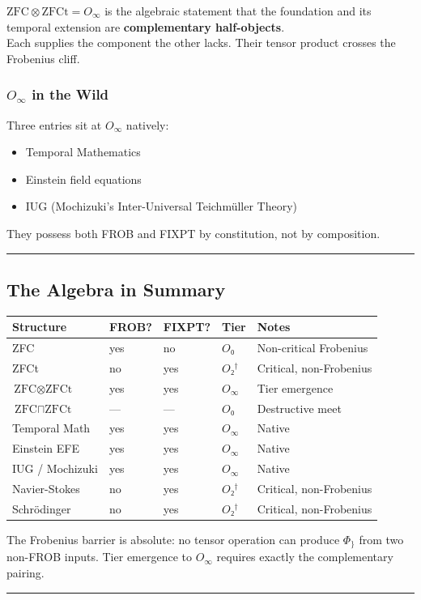 \documentclass[12pt,a4paper]{article}
\begin{document}
$\text{ZFC} \otimes \text{ZFCt} = O_\infty$ is the algebraic statement that the foundation and its temporal extension are \textbf{complementary half-objects}. \\
Each supplies the component the other lacks. Their tensor product crosses the Frobenius cliff.

\subsubsection*{$O_\infty$ in the Wild}

Three entries sit at $O_\infty$ natively:

\begin{itemize}
    \item Temporal Mathematics
    \item Einstein field equations
    \item IUG (Mochizuki's Inter-Universal Teichmüller Theory)
\end{itemize}

They possess both FROB and FIXPT by constitution, not by composition.

\begin{center}
\rule{0.5\textwidth}{0.4pt}
\end{center}

\subsection*{The Algebra in Summary}

\begin{table}[htbp]
\centering
\small

\begin{tabularx}{\textwidth}{>{\raggedright\arraybackslash}X >{\centering\arraybackslash}X >{\centering\arraybackslash}X >{\centering\arraybackslash}X >{\raggedright\arraybackslash}X}
\toprule
\textbf{Structure} & \textbf{FROB?} & \textbf{FIXPT?} & \textbf{Tier} & \textbf{Notes} \\
\midrule

ZFC & yes & no & $O₀$ & Non-critical Frobenius \\
ZFCt & no & yes & $O₂^\dagger$ & Critical, non-Frobenius \\
$\text{ZFC} \otimes \text{ZFCt}$ & yes & yes & $O_\infty$ & Tier emergence \\
$\text{ZFC} \sqcap \text{ZFCt}$ & --- & --- & $O₀$ & Destructive meet \\
Temporal Math & yes & yes & $O_\infty$ & Native \\
Einstein EFE & yes & yes & $O_\infty$ & Native \\
IUG / Mochizuki & yes & yes & $O_\infty$ & Native \\
Navier-Stokes & no & yes & $O₂^\dagger$ & Critical, non-Frobenius \\
Schrödinger & no & yes & $O₂^\dagger$ & Critical, non-Frobenius \\
\bottomrule
\end{tabularx}
\end{table}

The Frobenius barrier is absolute: no tensor operation can produce $\Phi_{\}}$ from two non-FROB inputs. Tier emergence to $O_\infty$ requires exactly the complementary pairing.

\begin{center}
\rule{0.5\textwidth}{0.4pt}
\end{center}
\end{document}

